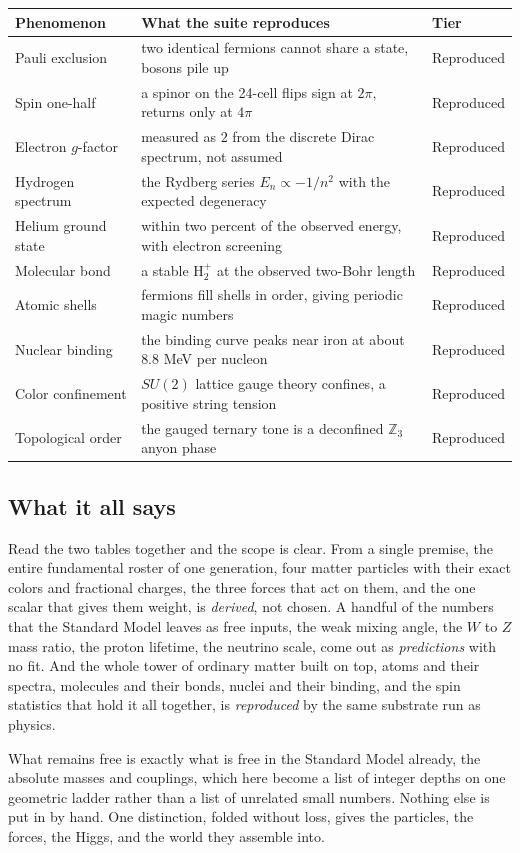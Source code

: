 \begin{center}
\renewcommand{\arraystretch}{1.25}
\begin{tabular}{p{} p{} p{}}
  \toprule
  \textbf{Phenomenon} & \textbf{What the suite reproduces} & \textbf{Tier} \\
  \midrule
  Pauli exclusion       & two identical fermions cannot share a state, bosons pile up & Reproduced \\
  Spin one-half         & a spinor on the 24-cell flips sign at $2\pi$, returns only at $4\pi$ & Reproduced \\
  Electron $g$-factor    & measured as $2$ from the discrete Dirac spectrum, not assumed & Reproduced \\
  Hydrogen spectrum     & the Rydberg series $E_n \propto -1/n^2$ with the expected degeneracy & Reproduced \\
  Helium ground state   & within two percent of the observed energy, with electron screening & Reproduced \\
  Molecular bond        & a stable $\mathrm{H}_2^+$ at the observed two-Bohr length & Reproduced \\
  Atomic shells         & fermions fill shells in order, giving periodic magic numbers & Reproduced \\
  Nuclear binding       & the binding curve peaks near iron at about $8.8$ MeV per nucleon & Reproduced \\
  Color confinement     & $SU(2)$ lattice gauge theory confines, a positive string tension & Reproduced \\
  Topological order      & the gauged ternary tone is a deconfined $\mathbb{Z}_3$ anyon phase & Reproduced \\
  \bottomrule
\end{tabular}
\end{center}

\subsection{What it all says}

Read the two tables together and the scope is clear. From a single premise, the entire fundamental roster of one
generation, four matter particles with their exact colors and fractional charges, the three forces that act on them,
and the one scalar that gives them weight, is \emph{derived}, not chosen. A handful of the numbers that the Standard
Model leaves as free inputs, the weak mixing angle, the $W$ to $Z$ mass ratio, the proton lifetime, the neutrino scale,
come out as \emph{predictions} with no fit. And the whole tower of ordinary matter built on top, atoms and their
spectra, molecules and their bonds, nuclei and their binding, and the spin statistics that hold it all together, is
\emph{reproduced} by the same substrate run as physics.

What remains free is exactly what is free in the Standard Model already, the absolute masses and couplings, which here
become a list of integer depths on one geometric ladder rather than a list of unrelated small numbers. Nothing else is
put in by hand. One distinction, folded without loss, gives the particles, the forces, the Higgs, and the world they
assemble into.
